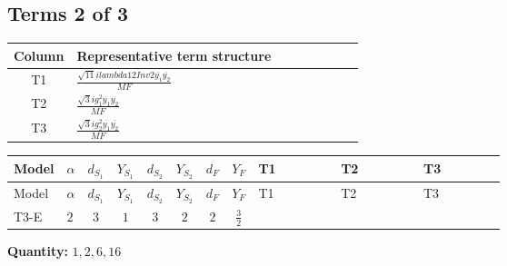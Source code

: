\documentclass[8pt]{article}
\begin{document}
\begin{landscape}
\subsection*{Terms 2 of 3}
\begin{center}
\begin{tabular}{@{}c >{\raggedright\arraybackslash}p{0.82\linewidth}@{}}
\toprule
Column & Representative term structure \\
\midrule
T1 & \(\displaystyle \frac{\sqrt{11} i lambda12Inv2 \overline{y_{1}} \overline{y_{2}}}{MF}\) \\
\midrule
T2 & \(\displaystyle \frac{\sqrt{3} i g_{1}^{2} \overline{y_{1}} \overline{y_{2}}}{MF}\) \\
\midrule
T3 & \(\displaystyle \frac{\sqrt{3} i g_{2}^{2} \overline{y_{1}} \overline{y_{2}}}{MF}\) \\
\midrule
\bottomrule
\end{tabular}
\end{center}
\smallskip
\tiny
\begin{longtable}{@{}llcccccc >{\raggedright\arraybackslash}p{0.21\linewidth} >{\raggedright\arraybackslash}p{0.21\linewidth} >{\raggedright\arraybackslash}p{0.21\linewidth}@{}}
\toprule
Model & $\alpha$ & $d_{S_1}$ & $Y_{S_1}$ & $d_{S_2}$ & $Y_{S_2}$ & $d_F$ & $Y_F$ & T1 & T2 & T3 \\
\midrule
\endfirsthead
\toprule
Model & $\alpha$ & $d_{S_1}$ & $Y_{S_1}$ & $d_{S_2}$ & $Y_{S_2}$ & $d_F$ & $Y_F$ & T1 & T2 & T3 \\
\midrule
\endhead
T3-E & $2$ & $3$ & $1$ & $3$ & $2$ & $2$ & $\frac{3}{2}$ & \scriptsize\adjustbox{max width=\linewidth}{$\begin{gathered} \frac{3 \sqrt{11} i lambda12Inv2 \overline{y_{1}} \overline{y_{2}}}{22 MF}\end{gathered}$} & \scriptsize\adjustbox{max width=\linewidth}{$\begin{gathered} \frac{9 \sqrt{3} i g_{1}^{2} \overline{y_{1}} \overline{y_{2}}}{8 MF}\end{gathered}$} & \scriptsize\adjustbox{max width=\linewidth}{$\begin{gathered} \frac{15 \sqrt{3} i g_{2}^{2} \overline{y_{1}} \overline{y_{2}}}{8 MF}\end{gathered}$} \\
\midrule
\bottomrule
\end{longtable}
\clearpage
\noindent\textbf{Quantity: }$\mathrm{1,2,6,16}$\par\smallskip

\end{landscape}
\end{document}
